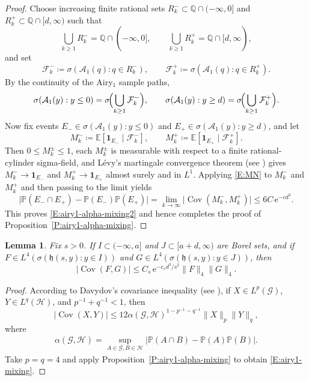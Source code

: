 \documentclass[12pt, reqno]{amsart}
\numberwithin{equation}{section}
\newtheorem{lemma}[theorem]{Lemma}
\theoremstyle{definition}
\newcommand{\E}{\mathbb{E}}
\newcommand{\h}{\mathfrak{h}}
\newcommand{\Cov}{\operatorname{Cov}}
\newcommand{\Prob}{\mathbb{P}}
\newcommand{\e}{\,\mathrm{e}}
\newcommand{\Acal}{\mathcal{A}}
\newcommand{\one}{\mathbf{1}}
\begin{document}
\begin{proof}
  Choose increasing finite rational sets $R_k^-\subset
  \mathbb{Q}\cap(-\infty,0]$ and $R_k^+\subset \mathbb{Q}\cap[d,\infty)$ such
  that
  \[
    \bigcup_{k\ge1} R_k^- = \mathbb{Q}\cap(-\infty,0], \qquad
    \bigcup_{k\ge1} R_k^+ = \mathbb{Q}\cap[d,\infty),
  \]
  and set
  \[
    \mathcal{F}_k^- \coloneqq \sigma(\Acal_1(q):q\in R_k^-), \qquad
    \mathcal{F}_k^+ \coloneqq \sigma(\Acal_1(q):q\in R_k^+).
  \]
  By the continuity of the Airy$_1$ sample paths,
  \[
    \sigma(\Acal_1(y):y\le 0)=\sigma\!\Bigl(\bigcup_{k\ge1}\mathcal{F}_k^-\Bigr), \qquad
    \sigma(\Acal_1(y):y\ge d)=\sigma\!\Bigl(\bigcup_{k\ge1}\mathcal{F}_k^+\Bigr).
  \]
  Now fix events $E_-\in\sigma(\Acal_1(y):y\le0)$ and
  $E_+\in\sigma(\Acal_1(y):y\ge d)$, and let
  \[
    M_k^- \coloneqq \E[\one_{E_-}\mid\mathcal{F}_k^-], \qquad
    M_k^+ \coloneqq \E[\one_{E_+}\mid\mathcal{F}_k^+].
  \]
  Then $0\le M_k^{\pm}\le1$, each $M_k^\pm$ is measurable with respect to a
  finite rational-cylinder sigma-field, and L\'{e}vy's martingale convergence
  theorem (see \cite[Section 14.2]{williams:91:probability}) gives
  $M_k^-\to\one_{E_-}$ and $M_k^+\to\one_{E_+}$ almost surely and in $L^1$.
  Applying \eqref{E:MN} to $M_k^-$ and $M_k^+$ and then passing to the limit
  yields
  \[
    \bigl|\Prob(E_-\cap E_+)-\Prob(E_-)\Prob(E_+)\bigr|
    =
    \lim_{k\to\infty} \bigl|\Cov(M_k^-,M_k^+)\bigr|
    \le 6C \e^{-c d^3}.
  \]
  This proves \eqref{E:airy1-alpha-mixing2} and hence completes the proof of
  Proposition~\ref{P:airy1-alpha-mixing}.
\end{proof}


\begin{lemma}\label{L:alpha-to-l4}
  Fix $s>0$. If $I\subset(-\infty,a]$ and $J\subset[a+d,\infty)$ are Borel sets,
  and if $F\in L^4(\sigma(\h(s,y):y\in I))$ and $G\in L^4(\sigma(\h(s, y):y\in
  J))$, then
  \begin{equation}
    |\Cov(F,G)|
    \le
    C_s \e^{-c_s d^3/s^2}\|F\|_4\|G\|_4.
    \label{E:airy1-mixing}
  \end{equation}
\end{lemma}

\begin{proof}
  According to Davydov's covariance inequality (see
  \cite{davydov:68:convergence}), if $X\in L^p(\mathcal G)$, $Y\in L^q(\mathcal
  H)$, and $p^{-1}+q^{-1}<1$, then
  \[
    |\Cov(X,Y)|
    \le
    12\alpha(\mathcal G,\mathcal H)^{1-p^{-1}-q^{-1}}
    \|X\|_p\|Y\|_q,
  \]
  where 
  \begin{align*}
  \alpha(\mathcal G,\mathcal H)=\sup_{A\in \mathcal G, B\in \mathcal H}|\Prob(A\cap B)-\Prob(A)\Prob(B)|.
  \end{align*}
    Take $p=q=4$ and apply Proposition~\ref{P:airy1-alpha-mixing} to obtain
    \eqref{E:airy1-mixing}.
\end{proof}
\end{document}
